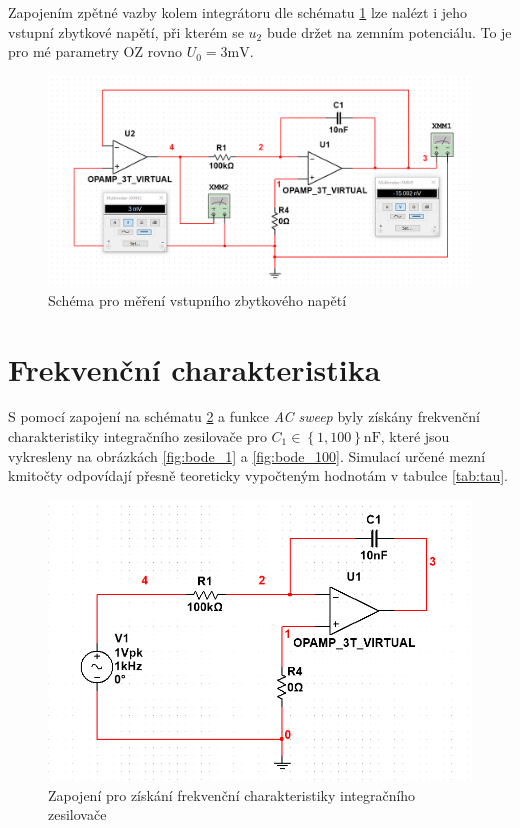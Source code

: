 \documentclass[twoside]{article}
\begin{document}
Zapojením zpětné vazby kolem integrátoru dle schématu \ref{fig:vstupni_zbytkove} lze nalézt i jeho vstupní zbytkové napětí,
při kterém se $u_2$ bude držet na zemním potenciálu. To je pro mé parametry OZ rovno $U_0 = 3\si{\milli\volt}$.

\begin{figure}[h!]
    \centering
    \includegraphics[width=0.65\linewidth]{vstupni_zbytkove.png}
    \caption{Schéma pro měření vstupního zbytkového napětí}
    \label{fig:vstupni_zbytkove}
\end{figure}

\newpage
\section{Frekvenční charakteristika}

S pomocí zapojení na schématu \ref{fig:schema_bode} a funkce \textit{AC sweep} byly
získány frekvenční charakteristiky integračního zesilovače pro $C_1 \in \left\{1, 100\right\} \si{\nano\farad}$,
které jsou vykresleny na obrázkách \ref{fig:bode_1} a \ref{fig:bode_100}.
Simulací určené mezní kmitočty odpovídají přesně teoreticky vypočteným hodnotám v tabulce \ref{tab:tau}.

\begin{figure}[h!]
    \centering
    \includegraphics[width=0.8\linewidth]{bode_schema.png}
    \caption{Zapojení pro získání frekvenční charakteristiky integračního zesilovače}
    \label{fig:schema_bode}
\end{figure}
\end{document}
